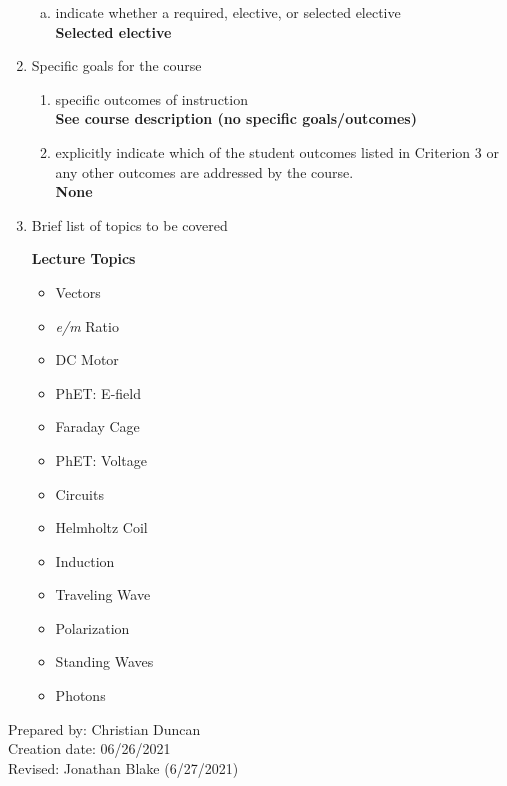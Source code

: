 \begin{enumerate}[1.]
\begin{enumerate}[a.]
\item indicate whether a required, elective, or selected elective\\ %
  {\bfseries
    Selected elective
  }

\end{enumerate}

\item Specific goals for the course
\begin{enumerate}
\item specific outcomes of instruction\\ %
  {\bfseries
    See course description (no specific goals/outcomes)
  }

\item explicitly indicate which of the student outcomes listed in Criterion 3 or any other outcomes are addressed by the course.\\
  {\bfseries
    None
  }
\end{enumerate}

\item Brief list of topics to be covered\\
  {\bfseries
    Lecture Topics
    \begin{itemize}
      \item Vectors
      \item \emph{e/m} Ratio
      \item DC Motor
      \item PhET: E-field
      \item Faraday Cage
      \item PhET: Voltage
      \item Circuits
      \item Helmholtz Coil
      \item Induction
      \item Traveling Wave
      \item Polarization
      \item Standing Waves
      \item Photons
    \end{itemize}
  }

\end{enumerate}

\noindent Prepared by: Christian Duncan\\
\noindent Creation date: 06/26/2021\\
\noindent Revised: Jonathan Blake (6/27/2021)\\
